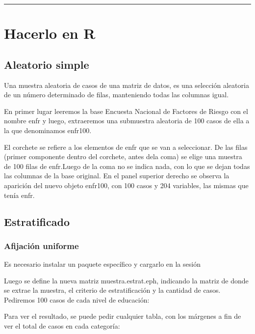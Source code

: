 \documentclass[]{book}
\begin{document}
\begin{center}\rule{0.5\linewidth}{\linethickness}\end{center}

\hypertarget{hacerlo-en-r-4}{%
\section{Hacerlo en R}\label{hacerlo-en-r-4}}

\hypertarget{aleatorio-simple}{%
\subsection{Aleatorio simple}\label{aleatorio-simple}}

Una muestra aleatoria de casos de una matriz de datos, es una selección aleatoria de un número determinado de filas, manteniendo todas las columnas igual.

En primer lugar leeremos la base Encuesta Nacional de Factores de Riesgo con el nombre enfr y luego, extraeremos una submuestra aleatoria de 100 casos de ella a la que denominamos enfr100.

El corchete se refiere a los elementos de enfr que se van a seleccionar. De las filas (primer componente dentro del corchete, antes dela coma) se elige una muestra de 100 filas de enfr.Luego de la coma no se indica nada, con lo que se dejan todas las columnas de la base original. En el panel superior derecho se observa la aparición del nuevo objeto enfr100, con 100 casos y 204 variables, las mismas que tenía enfr.

\hypertarget{estratificado}{%
\subsection{Estratificado}\label{estratificado}}

\hypertarget{afijacion-uniforme}{%
\subsubsection{Afijación uniforme}\label{afijacion-uniforme}}

Es necesario instalar un paquete específico y cargarlo en la sesión

Luego se define la nueva matriz muestra.estrat.eph, indicando la matriz de donde se extrae la muestra, el criterio de estratificación y la cantidad de casos. Pediremos 100 casos de cada nivel de educación:

Para ver el resultado, se puede pedir cualquier tabla, con los márgenes a fin de ver el total de casos en cada categoría:
\end{document}
